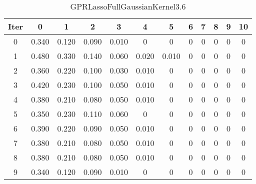 \begin{table}
	\begin{center}
		\begin{tabular}{|c|c|c|c|c|c|c|c|c|c|c|c|}
			\hline
			Iter & 0 & 1 & 2 & 3 & 4 & 5 & 6 & 7 & 8 & 9 & 10 \\
			\hline
			0 & 0.340 & 0.120 & 0.090 & 0.010 & 0 & 0 & 0 & 0 & 0 & 0 & 0 \\
			\hline
			1 & 0.480 & 0.330 & 0.140 & 0.060 & 0.020 & 0.010 & 0 & 0 & 0 & 0 & 0 \\
			\hline
			2 & 0.360 & 0.220 & 0.100 & 0.030 & 0.010 & 0 & 0 & 0 & 0 & 0 & 0 \\
			\hline
			3 & 0.420 & 0.230 & 0.100 & 0.050 & 0.010 & 0 & 0 & 0 & 0 & 0 & 0 \\
			\hline
			4 & 0.380 & 0.210 & 0.080 & 0.050 & 0.010 & 0 & 0 & 0 & 0 & 0 & 0 \\
			\hline
			5 & 0.350 & 0.230 & 0.110 & 0.060 & 0 & 0 & 0 & 0 & 0 & 0 & 0 \\
			\hline
			6 & 0.390 & 0.220 & 0.090 & 0.050 & 0.010 & 0 & 0 & 0 & 0 & 0 & 0 \\
			\hline
			7 & 0.380 & 0.210 & 0.080 & 0.050 & 0.010 & 0 & 0 & 0 & 0 & 0 & 0 \\
			\hline
			8 & 0.380 & 0.210 & 0.080 & 0.050 & 0.010 & 0 & 0 & 0 & 0 & 0 & 0 \\
			\hline
			9 & 0.340 & 0.120 & 0.090 & 0.010 & 0 & 0 & 0 & 0 & 0 & 0 & 0 \\
			\hline
		\end{tabular}
	\end{center}
	\caption{GPRLassoFullGaussianKernel3.6}
\end{table}